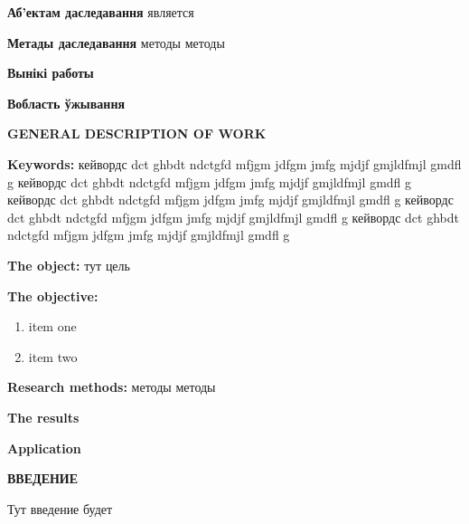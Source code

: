 \textbf{Аб’ектам даследавання} является


\textbf{Метады даследавання} методы методы

\textbf{Вынікі работы}

\textbf{Вобласть ўжывання}


\newpage
{}
\begin{center}
	\textbf{\large GENERAL DESCRIPTION OF WORK}
\end{center}

\textbf{Keywords:} кейвордс dct ghbdt ndctgfd mfjgm jdfgm jmfg mjdjf gmjldfmjl gmdfl g
кейвордс dct ghbdt ndctgfd mfjgm jdfgm jmfg mjdjf gmjldfmjl gmdfl g
кейвордс dct ghbdt ndctgfd mfjgm jdfgm jmfg mjdjf gmjldfmjl gmdfl g
кейвордс dct ghbdt ndctgfd mfjgm jdfgm jmfg mjdjf gmjldfmjl gmdfl g
кейвордс dct ghbdt ndctgfd mfjgm jdfgm jmfg mjdjf gmjldfmjl gmdfl g

\textbf{The object:} тут цель

\textbf{The objective:}
\begin{enumerate}
	\item item one
	\item item two
\end{enumerate}


\textbf{Research methods:} методы методы

\textbf{The results}

\textbf{Application}

\newpage
{}
\begin{center}
	\textbf{\large ВВЕДЕНИЕ}
\end{center}

Тут введение будет
